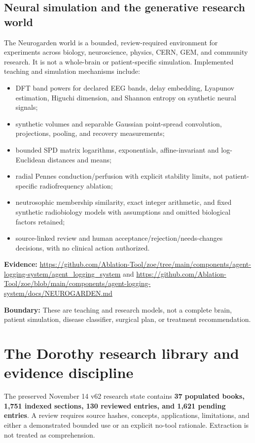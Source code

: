 \documentclass[11pt]{article}
\newcommand{\boundary}[1]{\par\smallskip\small\color{ZoeGray}\textbf{Boundary:} #1\normalsize\par\smallskip}
\newcommand{\evidence}[1]{\par\smallskip\small\color{ZoeGray}\textbf{Evidence:} #1\normalsize\par\smallskip}
\begin{document}
\subsection{Neural simulation and the generative research world}

The Neurogarden world is a bounded, review-required environment for experiments across biology, neuroscience, physics, CERN, GEM, and community research. It is not a whole-brain or patient-specific simulation. Implemented teaching and simulation mechanisms include:

\begin{itemize}
  \item DFT band powers for declared EEG bands, delay embedding, Lyapunov estimation, Higuchi dimension, and Shannon entropy on synthetic neural signals;
  \item synthetic volumes and separable Gaussian point-spread convolution, projections, pooling, and recovery measurements;
  \item bounded SPD matrix logarithms, exponentials, affine-invariant and log-Euclidean distances and means;
  \item radial Pennes conduction/perfusion with explicit stability limits, not patient-specific radiofrequency ablation;
  \item neutrosophic membership similarity, exact integer arithmetic, and fixed synthetic radiobiology models with assumptions and omitted biological factors retained;
  \item source-linked review and human acceptance/rejection/needs-changes decisions, with no clinical action authorized.
\end{itemize}

\evidence{\url{https://github.com/Ablation-Tool/zoe/tree/main/components/agent-logging-system/agent_logging_system} and \url{https://github.com/Ablation-Tool/zoe/blob/main/components/agent-logging-system/docs/NEUROGARDEN.md}}
\boundary{These are teaching and research models, not a complete brain, patient simulation, disease classifier, surgical plan, or treatment recommendation.}

\clearpage
\section{The Dorothy research library and evidence discipline}

The preserved November 14 v62 research state contains \textbf{37 populated books, 1,751 indexed sections, 130 reviewed entries, and 1,621 pending entries}. A review requires source hashes, concepts, applications, limitations, and either a demonstrated bounded use or an explicit no-tool rationale. Extraction is not treated as comprehension.
\end{document}
